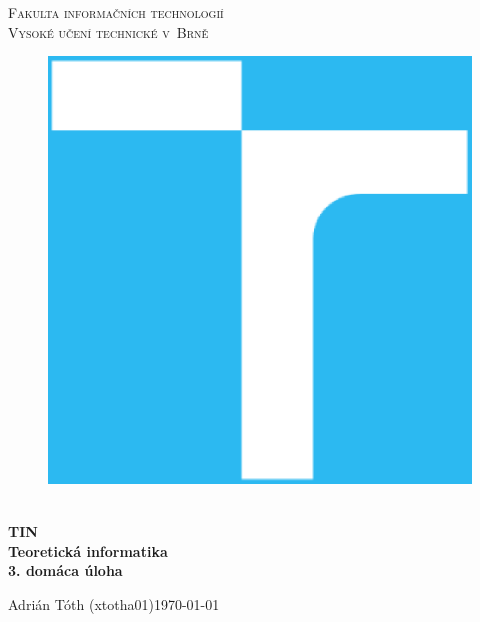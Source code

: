 \documentclass[11pt,a4paper]{article}
\begin{document}
\begin{titlepage}
    \begin{center}
        \Huge
        \textsc{
            Fakulta informačních technologií\\
            Vysoké učení technické v~Brně
        }
        \vspace{80px}
        \begin{figure}[!h]
            \centering
            \includegraphics[scale=0.3]{img/vutbr-fit-logo.eps}
        \end{figure}
        \\[15mm]
        \Huge{
            \textbf{
                TIN
            }
        }
        \\[1.5mm]
        \huge{
            \textbf{
                Teoretická informatika
            }
        }
        \\[2.5em]
        \LARGE{
            \textbf{
                3. domáca úloha
            }
        }
        \vfill
    \end{center}
        \Large{
            Adrián Tóth (xtotha01)\hfill \today
        }
\end{titlepage}

\setlength{\parskip}{0pt}
\hypersetup{hidelinks}\tableofcontents
\setlength{\parskip}{0pt}
\end{document}

